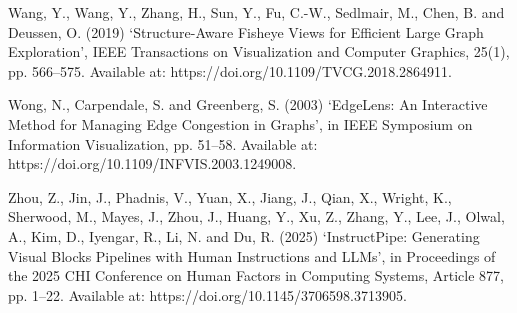 \documentclass[11pt,a4paper,oneside,extrafontsizes]{memoir}
\begin{document}
Wang, Y., Wang, Y., Zhang, H., Sun, Y., Fu, C.-W., Sedlmair, M., Chen, B. and Deussen, O. (2019) ‘Structure-Aware Fisheye Views for Efficient Large Graph Exploration’, IEEE Transactions on Visualization and Computer Graphics, 25(1), pp. 566–575. Available at: https://doi.org/10.1109/TVCG.2018.2864911.

Wong, N., Carpendale, S. and Greenberg, S. (2003) ‘EdgeLens: An Interactive Method for Managing Edge Congestion in Graphs’, in IEEE Symposium on Information Visualization, pp. 51–58. Available at: https://doi.org/10.1109/INFVIS.2003.1249008.

Zhou, Z., Jin, J., Phadnis, V., Yuan, X., Jiang, J., Qian, X., Wright, K., Sherwood, M., Mayes, J., Zhou, J., Huang, Y., Xu, Z., Zhang, Y., Lee, J., Olwal, A., Kim, D., Iyengar, R., Li, N. and Du, R. (2025) ‘InstructPipe: Generating Visual Blocks Pipelines with Human Instructions and LLMs’, in Proceedings of the 2025 CHI Conference on Human Factors in Computing Systems, Article 877, pp. 1–22. Available at: https://doi.org/10.1145/3706598.3713905.
\end{document}

